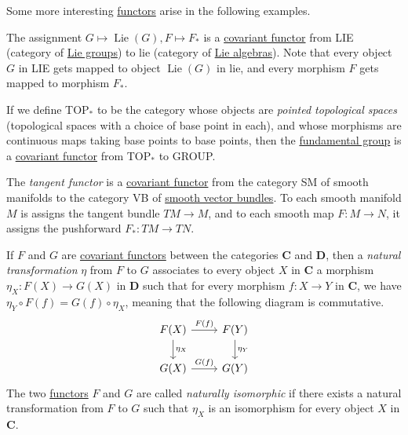 \documentclass{article}
\DeclareMathOperator{\Lie}{Lie}
\newcounter{definition}[section]
\newcounter{example}[section]
\begin{document}
    Some more interesting \hyperref[cat-def:functor]{functors} arise in the following examples. 

    \begin{example}
      \label{ex:the-lie-functor}
    The assignment $G \mapsto \Lie(G), F \mapsto F_*$ is a \hyperref[def:covariant-functor]{covariant functor} from LIE (category of \hyperref[def:lie-group]{Lie groups}) to lie (category of \hyperref[def:lie-algebra]{Lie algebras}). Note that every object $G$ in LIE gets mapped to object $\Lie(G)$ in lie, and every morphism $F$ gets mapped to morphism $F_*$. 
    \end{example}

    \begin{example}
      \label{ex:the-category-of-pointed-topological-spaces}
    If we define TOP$_*$ to be the category whose objects are \textit{pointed topological spaces} (topological spaces with a choice of base point in each), and whose morphisms are continuous maps taking base points to base points, then the \hyperref[at-def:fundamental-group]{fundamental group} is a \hyperref[def:covariant-functor]{covariant functor} from TOP$_*$ to GROUP. 
    \end{example}

    \begin{definition}
      \label{def:tangent-functor}
    The \textit{tangent functor} is a \hyperref[def:covariant-functor]{covariant functor} from the category SM of smooth manifolds to the category VB of \hyperref[def:smooth-vector-bundle]{smooth vector bundles}. To each smooth manifold $M$ is assigns the tangent bundle $TM \rightarrow M$, and to each smooth map $F: M \to N$, it assigns the pushforward $F_* : TM \to TN$.
    \end{definition}

    \begin{definition}
      \label{def:natural-transformation}
    If $F$ and $G$ are \hyperref[def:covariant-functor]{covariant functors} between the categories $\mathbf{C}$ and $\mathbf{D}$, then a \textit{natural transformation} $\eta$ from $F$ to $G$ associates to every object $X$ in $\mathbf{C}$ a morphism $\eta_X: F(X) \to G(X)$ in $\mathbf{D}$ such that for every morphism $f: X \to Y$ in $\mathbf{C}$, we have $\eta_Y \circ F(f) = G(f) \circ \eta_X$, meaning that the following diagram is commutative. 
    \begin{equation}
      \begin{tikzcd}
          F(X) \arrow{r}{F(f)} \arrow{d}{\eta_X} & F(Y) \arrow{d}{\eta_Y} \\
          G(X) \arrow{r}{G(f)} & G(Y)
          \end{tikzcd}
    \end{equation}
    The two \hyperref[cat-def:functor]{functors} $F$ and $G$ are called \textit{naturally isomorphic} if there exists a natural transformation from $F$ to $G$ such that $\eta_X$ is an isomorphism for every object $X$ in $\mathbf{C}$. 
    \end{definition}
\end{document}
